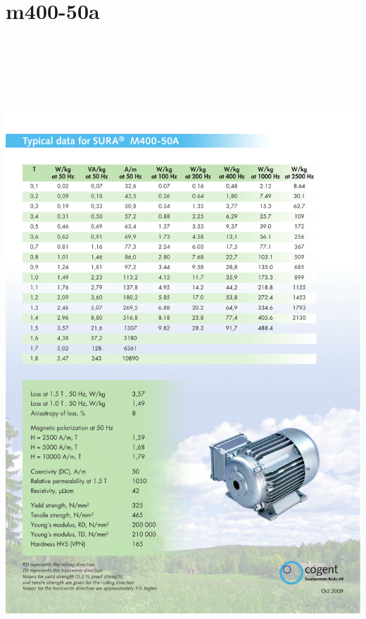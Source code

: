 \fancyhf{}
\pagestyle{fancy}
\section{m400-50a}\label{appendixb}
\begin{center}
\includegraphics[height=690pt]{extra/m400-50a.pdf}
\end{center}
